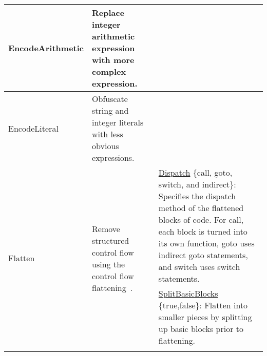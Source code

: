 \begin{table*}[!hp]
\begin{tabular}{|p{2.25cm}|p{4cm}|p{11cm}|}
EncodeArithmetic                     & Replace integer arithmetic expression with more complex expression.                                                                                                                                                                                                                  &                                                                                                                                                                                                                                                                                            \\ \hline
EncodeLiteral                        & Obfuscate string and integer literals with less obvious expressions.                                                                                                                                                                                                                    &                                                                                                                                                                                                                                                                                               \\ \hline
\multirow{6}{*}{Flatten}             & \multirow{6}{4cm}{Remove structured control flow using the control flow flattening~\cite{wang00security}.}                                                                                                                                                                                         & \underline{Dispatch} \{call, goto, switch, and indirect\}: Specifies the dispatch method of the flattened blocks of code. For call, each block is turned into its own function, goto uses indirect goto statements, and switch uses switch statements.                                                                                                       \\ \cline{3-3} 
                                     &                                                                                                                                                                                                                                                                                                         & \underline{SplitBasicBlocks} \{true,false\}: Flatten into smaller pieces by splitting up basic blocks prior to flattening.                                                                                                                                                              \\ \cline{3-3} 

\end{tabular}
\end{table*}
